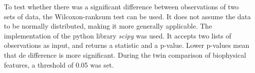 To test whether there was a significant difference between observations of two sets of data,
the Wilcoxon-ranksum test can be used.
It does not assume the data to be normally distributed,
making it more generally applicable.
The implementation of the python library \textit{scipy} was used.
It accepts two lists of observations as input,
and returns a statistic and a p-value. 
Lower p-values mean that de difference is more significant.
During the twin comparison of biophysical features, 
a threshold of 0.05 was set.
